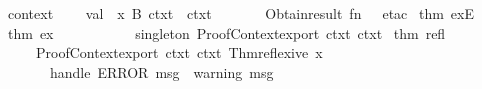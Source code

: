 \begin{isabellebody}
\isaantiq
context{}%
\endisaantiq
{}\isanewline
\ \ \ \ val\ {}{}{}{}{}{}\ x{}{}{}\ {}B{}{}{}\ ctxt{}{}\ {}\ ctxt{}\isanewline
\ \ \ \ \ \ {}{}\ Obtain{}result\ {}fn\ {}\ {}{}\ etac\ %
\isaantiq
thm\ exE{}%
\endisaantiq
\ {}{}\ {}%
\isaantiq
thm\ ex{}%
\endisaantiq
{}{}\isanewline
\ \ {}\isanewline
\ \ \isamarkupfalse%
\ {}\isanewline
\ \ \ \ singleton\ {}Proof{}Context{}export\ ctxt{}\ ctxt{}{}\ %
\isaantiq
thm\ refl{}%
\endisaantiq
{}\isanewline
\ \ {}\isanewline
\ \ \isamarkupfalse%
\ {}\isanewline
\ \ \ \ Proof{}Context{}export\ ctxt{}\ ctxt{}\ {}Thm{}reflexive\ x{}\isanewline
\ \ \ \ \ \ handle\ ERROR\ msg\ {}{}\ {}warning\ msg{}\ {}{}{}{}\isanewline
\ \ {}\isanewline
{}\isamarkupfalse%
%
\endisatagML
{\isafoldML}%
%
\isadelimML
\isanewline
%
\endisadelimML
%
\isadelimtheory
\isanewline
%
\endisadelimtheory
%
\isatagtheory
{}\isamarkupfalse%
%
\endisatagtheory
{\isafoldtheory}%
%
\isadelimtheory
\isanewline
%
\endisadelimtheory
\end{isabellebody}%
